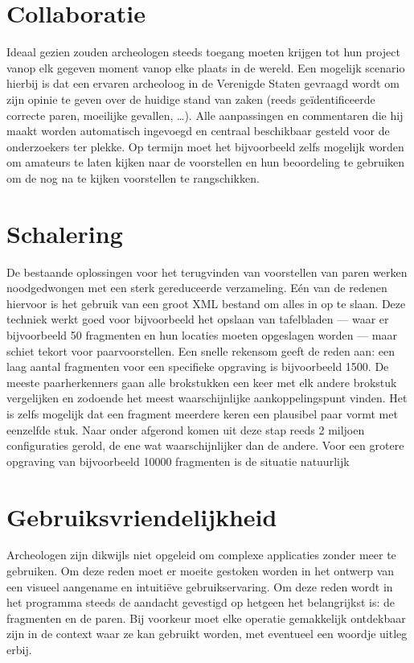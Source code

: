 \section{Collaboratie}
Ideaal gezien zouden archeologen steeds toegang moeten krijgen tot hun project vanop elk gegeven moment vanop elke plaats in de wereld. Een mogelijk scenario hierbij is dat een ervaren archeoloog in de Verenigde Staten gevraagd wordt om zijn opinie te geven over de huidige stand van zaken (reeds ge\"identificeerde correcte paren, moeilijke gevallen, \ldots). Alle aanpassingen en commentaren die hij maakt worden automatisch ingevoegd en centraal beschikbaar gesteld voor de onderzoekers ter plekke. Op termijn moet het bijvoorbeeld zelfs mogelijk worden om amateurs te laten kijken naar de voorstellen en hun beoordeling te gebruiken om de nog na te kijken voorstellen te rangschikken.

\section{Schalering}
De bestaande oplossingen voor het terugvinden van voorstellen van paren werken noodgedwongen met een sterk gereduceerde verzameling. E\'en van de redenen hiervoor is het gebruik van een groot XML bestand om alles in op te slaan. Deze techniek werkt goed voor bijvoorbeeld het opslaan van tafelbladen --- waar er bijvoorbeeld 50 fragmenten en hun locaties moeten opgeslagen worden --- maar schiet tekort voor paarvoorstellen. Een snelle rekensom geeft de reden aan: een laag aantal fragmenten voor een specifieke opgraving is bijvoorbeeld 1500. De meeste paarherkenners gaan alle brokstukken een keer met elk andere brokstuk vergelijken en zodoende het meest waarschijnlijke aankoppelingspunt vinden. Het is zelfs mogelijk dat een fragment meerdere keren een plausibel paar vormt met eenzelfde stuk. Naar onder afgerond komen uit deze stap reeds 2 miljoen configuraties gerold, de ene wat waarschijnlijker dan de andere. Voor een grotere opgraving van bijvoorbeeld 10000 fragmenten is de situatie natuurlijk

\section{Gebruiksvriendelijkheid}
Archeologen zijn dikwijls niet opgeleid om complexe applicaties zonder meer te gebruiken. Om deze reden moet er moeite gestoken worden in het ontwerp van een visueel aangename en intuiti\"eve gebruikservaring. Om deze reden wordt in het programma steeds de aandacht gevestigd op hetgeen het belangrijkst is: de fragmenten en de paren. Bij voorkeur moet elke operatie gemakkelijk ontdekbaar zijn in de context waar ze kan gebruikt worden, met eventueel een woordje uitleg erbij.\\

